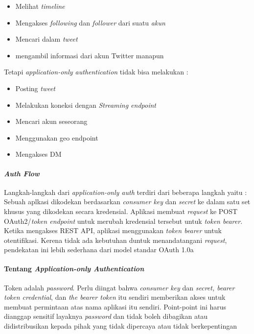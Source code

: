 \begin{itemize}
	\item Melihat \textit{timeline}
	\item Mengakses \textit{following} dan \textit{follower} dari suatu \textit{akun}
	\item Mencari dalam \textit{tweet}
	\item mengambil informasi dari akun Twitter manapun
\end{itemize}


Tetapi \textit{application-only authentication} tidak bisa melakukan :

\begin{itemize}
	\item Posting \textit{tweet}
	\item Melakukan koneksi dengan \textit{Streaming endpoint}
	\item Mencari akun seseorang
	\item Menggunakan geo endpoint
	\item Mengakses DM
\end{itemize}

\paragraph{\textit{Auth Flow}}
Langkah-langkah dari \textit{application-only auth} terdiri dari beberapa langkah yaitu :
Sebuah aplkasi dikodekan berdasarkan \textit{consumer key} dan \textit{secret} ke dalam satu set khusus yang dikodekan secara kredensial.
Aplikasi membuat \textit{request} ke POST OAuth2/\textit{token endpoint} untuk merubah kredensial tersebut untuk \textit{token bearer}.
Ketika mengakses REST API, aplikasi menggunakan \textit{token bearer} untuk otentifikasi.
Kerena tidak ada kebutuhan duntuk menandatangani \textit{request}, pendekatan ini lebih sederhana dari model standar OAuth 1.0a

\paragraph{Tentang \textit{Application-only Authentication}}
Token adalah \textit{password}. Perlu diingat bahwa \textit{consumer key} dan \textit{secret, bearer token credential}, dan \textit{the bearer token} itu sendiri memberikan akses untuk membuat permintaan atas nama aplikasi itu sendiri. Point-point ini harus dianggap sensitif layaknya \textit{password} dan tidak boleh dibagikan atau didistribusikan kepada pihak yang tidak dipercaya atau tidak berkepentingan

